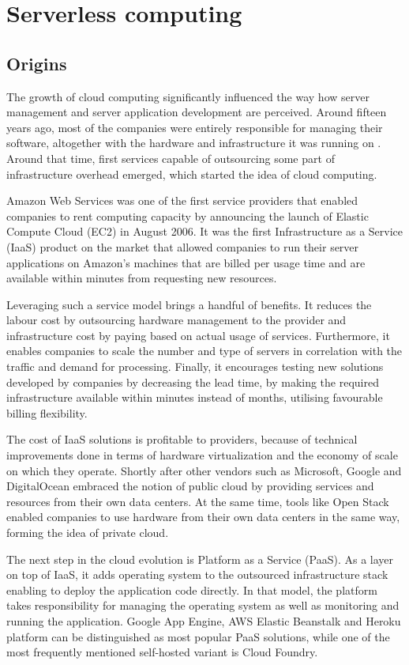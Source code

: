\chapter{Serverless computing}

\section{Origins}

The growth of cloud computing significantly influenced the way how server management and server application development are perceived. Around fifteen years ago, most of the companies were entirely responsible for managing their software, altogether with the hardware and infrastructure it was running on \cite{RobertsChapin2017}. Around that time, first services capable of outsourcing some part of infrastructure overhead emerged, which started the idea of cloud computing.

Amazon Web Services was one of the first service providers that enabled companies to rent computing capacity by announcing the launch of Elastic Compute Cloud (EC2) in August 2006. It was the first Infrastructure as a Service (IaaS) product on the market that allowed companies to run their server applications on Amazon's machines that are billed per usage time and are available within minutes from requesting new resources.

Leveraging such a service model brings a handful of benefits. It reduces the labour cost by outsourcing hardware management to the provider and infrastructure cost by paying based on actual usage of services. Furthermore, it enables companies to scale the number and type of servers in correlation with the traffic and demand for processing. Finally, it encourages testing new solutions developed by companies by decreasing the lead time, by making the required infrastructure available within minutes instead of months, utilising favourable billing flexibility.

The cost of IaaS solutions is profitable to providers, because of technical improvements done in terms of hardware virtualization and the economy of scale on which they operate. Shortly after other vendors such as Microsoft, Google and DigitalOcean embraced the notion of public cloud by providing services and resources from their own data centers. At the same time, tools like Open Stack enabled companies to use hardware from their own data centers in the same way, forming the idea of private cloud.

The next step in the cloud evolution is Platform as a Service (PaaS). As a layer on top of IaaS, it adds operating system to the outsourced infrastructure stack enabling to deploy the application code directly. In that model, the platform takes responsibility for managing the operating system as well as monitoring and running the application. Google App Engine, AWS Elastic Beanstalk and Heroku platform can be distinguished as most popular PaaS solutions, while one of the most frequently mentioned self-hosted variant is Cloud Foundry.

